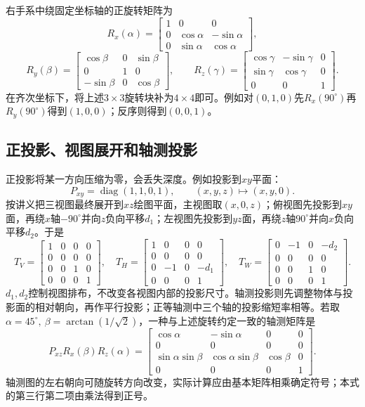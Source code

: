 右手系中绕固定坐标轴的正旋转矩阵为
\[
R_x(\alpha)=\begin{bmatrix}1&0&0\\0&\cos\alpha&-\sin\alpha\\0&\sin\alpha&\cos\alpha\end{bmatrix},
\]
\[
R_y(\beta)=\begin{bmatrix}\cos\beta&0&\sin\beta\\0&1&0\\-\sin\beta&0&\cos\beta\end{bmatrix},\qquad
R_z(\gamma)=\begin{bmatrix}\cos\gamma&-\sin\gamma&0\\\sin\gamma&\cos\gamma&0\\0&0&1\end{bmatrix}.
\]
在齐次坐标下，将上述$3\times3$旋转块补为$4\times4$即可。例如对$(0,1,0)$先$R_x(90^\circ)$再$R_y(90^\circ)$得到$(1,0,0)$；反序则得到$(0,0,1)$。

\subsection{正投影、视图展开和轴测投影}
正投影将某一方向压缩为零，会丢失深度。例如投影到$xy$平面：
\[
P_{xy}=\operatorname{diag}(1,1,0,1),\qquad (x,y,z)\mapsto(x,y,0).
\]
按讲义把三视图最终展开到$xz$绘图平面，主视图取$(x,0,z)$；俯视图先投影到$xy$面，再绕$x$轴$-90^\circ$并向$z$负向平移$d_1$；左视图先投影到$yz$面，再绕$z$轴$90^\circ$并向$x$负向平移$d_2$。于是
\[
T_V=\begin{bmatrix}1&0&0&0\\0&0&0&0\\0&0&1&0\\0&0&0&1\end{bmatrix},\quad
T_H=\begin{bmatrix}1&0&0&0\\0&0&0&0\\0&-1&0&-d_1\\0&0&0&1\end{bmatrix},\quad
T_W=\begin{bmatrix}0&-1&0&-d_2\\0&0&0&0\\0&0&1&0\\0&0&0&1\end{bmatrix}.
\]
$d_1,d_2$控制视图排布，不改变各视图内部的投影尺寸。轴测投影则先调整物体与投影面的相对朝向，再作平行投影；正等轴测中三个轴的投影缩短率相等。若取$\alpha=45^\circ,\ \beta=\arctan(1/\sqrt2)$，一种与上述旋转约定一致的轴测矩阵是
\[
P_{xz}R_x(\beta)R_z(\alpha)=
\begin{bmatrix}
\cos\alpha&-\sin\alpha&0&0\\
0&0&0&0\\
\sin\alpha\sin\beta&\cos\alpha\sin\beta&\cos\beta&0\\
0&0&0&1
\end{bmatrix}.
\]
轴测图的左右朝向可随旋转方向改变，实际计算应由基本矩阵相乘确定符号；本式的第三行第二项由乘法得到正号。

